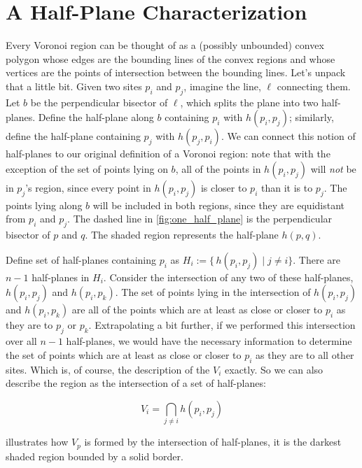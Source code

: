 \documentclass[12pt,twoside]{reedthesis}
\begin{document}
  
  \section{A Half-Plane Characterization} %
  \label{sec:half_plane_char}
    Every Voronoi region can be thought of as a (possibly unbounded) convex polygon whose edges are the bounding lines of the convex regions and whose vertices are the points of intersection between the bounding lines.  Let's unpack that a little bit. Given two sites $p_{i}$ and $p_{j}$, imagine the line, $\ell$ connecting them. Let $b$ be the perpendicular bisector of $\ell$, which splits the plane into two half-planes. Define the half-plane along $b$ containing $p_{i}$ with $h(p_{i}, p_{j})$; similarly, define the half-plane containing $p_{j}$ with $h(p_{j}, p_{i})$. We can connect this notion of half-planes to our original definition of a Voronoi region: note that with the exception of the set of points lying on $b$, all of the points in $h(p_{i}, p_{j})$ will \emph{not} be in $p_{j}$'s region, since every point in $h(p_{i}, p_{j})$ is closer to $p_{i}$ than it is to $p_{j}$. The points lying along $b$ will be included in both regions, since they are equidistant from $p_{i}$ and $p_{j}$. The dashed line in \cref{fig:one_half_plane} is the perpendicular bisector of $p$ and $q$. The shaded region represents the half-plane $h(p, q)$.\par

    Define set of half-planes containing $p_{i}$ as $H_{i} := \{\,h(p_{i}, p_{j}) \mid j\neq i \}$. There are $n-1$ half-planes in $H_{i}$. Consider the intersection of any two of these half-planes, $h(p_{i}, p_{j})$ and $h(p_{i}, p_{k})$. The set of points lying in the intersection of $h(p_{i}, p_{j})$ and $h(p_{i}, p_{k})$ are all of the points which are at least as close or closer to $p_{i}$ as they are to $p_{j}$ or $p_{k}$. Extrapolating a bit further, if we performed this intersection over all $n-1$ half-planes, we would have the necessary information to determine the set of points which are at least as close or closer to $p_{i}$ as they are to all other sites. Which is, of course, the description of the $V_{i}$ exactly. So we can also describe the region as the intersection of a set of half-planes:

    $$V_{i} = \bigcap_{j \neq i} h(p_{i}, p_{j})$$ 

     illustrates how $V_{p}$ is formed by the intersection of half-planes, it is the darkest shaded region bounded by a solid border.\par
\end{document}

